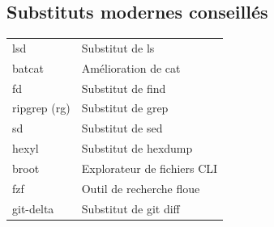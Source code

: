 \documentclass[9pt]{extarticle}
\begin{document}
\begin{multicols}{4}
    \section*{Substituts modernes conseillés}

    \begin{tabularx}{\columnwidth}{lX}
        lsd          & Substitut de ls             \\
        batcat       & Amélioration de cat         \\
        fd           & Substitut de find           \\
        ripgrep (rg) & Substitut de grep           \\
        sd           & Substitut de sed            \\
        hexyl        & Substitut de hexdump        \\
        broot        & Explorateur de fichiers CLI \\
        fzf          & Outil de recherche floue    \\
        git-delta    & Substitut de git diff       \\
    \end{tabularx}

\end{multicols}
\end{document}
